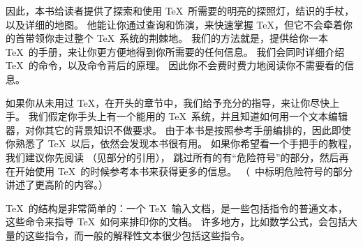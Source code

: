 因此，本书给读者提供了探索和使用 \TeX\ 所需要的明亮的探照灯，结识的手杖，以及详细的地图。
他能让你通过查询和饰演，来快速掌握 \TeX ，但它不会牵着你的首带领你走过整个 \TeX\ 系统的荆棘地。
我们的方法就是，提供给你一本 \TeX\ 的手册，来让你更方便地得到你所需要的任何信息。
我们会同时详细介绍 \TeX\ 的命令，以及命令背后的原理。
因此你不会费时费力地阅读你不需要看的信息。

如果你从未用过 \TeX ，在开头的章节中，我们给予充分的指导，来让你尽快上手。
我们假定你手头上有一个能用的 \TeX\ 系统，并且知道如何用一个文本编辑器，对你其它的背景知识不做要求。
由于本书是按照参考手册编排的，因此即使你熟悉了 \TeX\ 以后，依然会发现本书很有用。
如果你希望看一个手把手的教程，我们建议你先阅读 \texbook{}（见部分的引用），
跳过所有的有“危险符号”的部分，然后再在开始使用 \TeX\ 的时候参考本书来获得更多的信息。%
（\texbook\ 中标明危险符号的部分讲述了更高阶的内容。）

\TeX\ 的结构是非常简单的：一个 \TeX\ 输入文档，是一些包括指令的普通文本，
这些命令来指导 \TeX\ 如何来排印你的文档。
许多地方，比如数学公式，会包括大量的这些指令，而一般的解释性文本很少包括这些指令。

